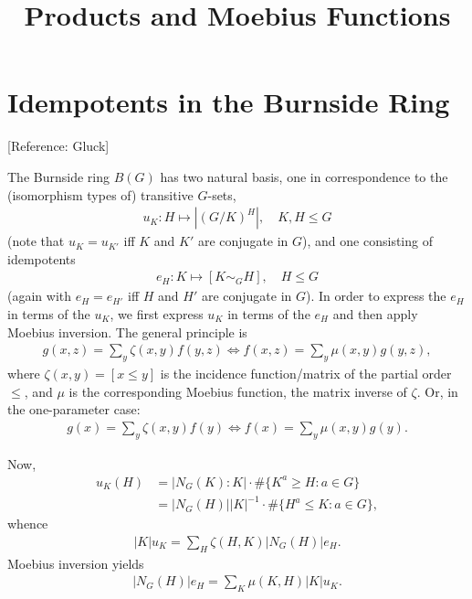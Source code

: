 \documentclass[12pt,a4paper]{amsart}
\title{Products and Moebius Functions}
\newcommand{\Size}[1]{\left|#1\right|}
\begin{document}
\maketitle

\section{Idempotents in the Burnside Ring}

[Reference: Gluck]

The Burnside ring $B(G)$ has two natural basis, one in correspondence
to the (isomorphism types of) transitive $G$-sets,
\begin{align*}
  u_K : H \mapsto |(G/K)^H|, \quad K, H \leq G
\end{align*}
(note that $u_K = u_{K'}$ iff $K$ and $K'$ are conjugate in $G$), and
one consisting of idempotents
\begin{align*}
e_H \colon K \mapsto [K \sim_G H],  \quad H \leq G
\end{align*}
(again with
$e_H = e_{H'}$ iff $H$ and $H'$ are conjugate in $G$).
In order to express the $e_H$ in terms of the $u_K$,
we first express $u_K$ in terms of the $e_H$ and then
apply Moebius inversion.  The general principle is
\begin{align*}
  g(x, z) = \sum_y \zeta(x, y) f(y, z) \iff
  f(x, z) = \sum_y \mu(x, y) g(y, z),
\end{align*}
where $\zeta(x, y) = [x \leq y]$ is the incidence function/matrix
of the partial order $\leq$, and $\mu$ is the corresponding Moebius
function, the matrix inverse of $\zeta$. Or, in the one-parameter case:
\begin{align*}
    g(x) = \sum_y \zeta(x, y) f(y) \iff
  f(x) = \sum_y \mu(x, y) g(y).
\end{align*}

Now,
\begin{align*}
  u_K(H) &= \Size{N_G(K) : K} \cdot \# \{K^a \geq H : a \in G\} \\
           &= \Size{N_G(H)} \Size{K}^{-1}
             \cdot \# \{H^a \leq K : a \in G\},
\end{align*}
whence
\begin{align*}
  \Size{K} u_K = \sum_H \zeta(H, K) \Size{N_G(H)} e_H.
\end{align*}
Moebius inversion yields
\begin{align*}
  \Size{N_G(H)} e_H
  =
  \sum_K \mu(K, H)
  \Size{K} u_K.
\end{align*}
\end{document}

